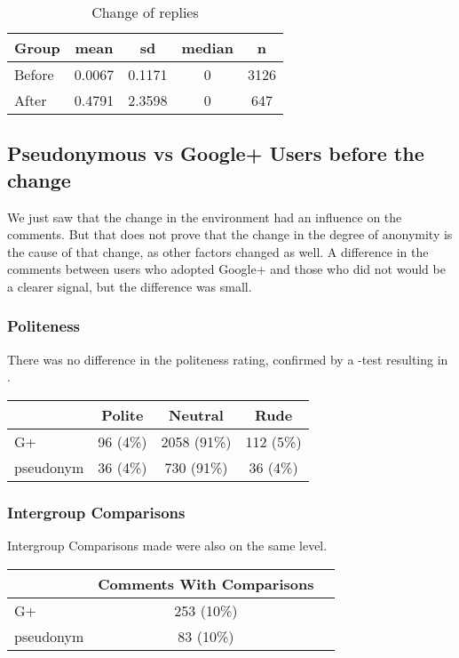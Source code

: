 \documentclass{chi-ext2}
\begin{document}
\begin{table}
\caption{Change of replies}
\centering
\begin{tabular}{| l | c | c | c | c |}
\hline
\hline
Group & mean & sd & median & n \\
\hline
Before & 0.0067 & 0.1171 & 0 & 3126 \\
After & 0.4791 & 2.3598 & 0 & 647 \\
\hline
\end{tabular}
\label{table:repliesChange}
\end{table}



\subsection{Pseudonymous vs Google+ Users before the change}

We just saw that the change in the environment had an influence on the comments. But that does not prove that the change in the degree of anonymity is the cause of that change, as other factors changed as well. A difference in the comments between users who adopted Google+ and those who did not would be a clearer signal, but the difference was small.

\subsubsection{Politeness}
There was no difference in the politeness rating, confirmed by a -test resulting in .

\begin{center}
\begin{tabular}{| l | c | c | c | }
    \hline
     & Polite & Neutral & Rude \\
    \hline
    G+ & 96 (4\%) & 2058 (91\%) & 112 (5\%) \\
    pseudonym & 36 (4\%) & 730 (91\%) & 36 (4\%) \\
 \hline
\end{tabular}
\end{center}

\subsubsection{Intergroup Comparisons}
Intergroup Comparisons made were also on the same level.

\begin{center}
\begin{tabular}{| l | c | c | }
    \hline
     & Comments With Comparisons \\
    \hline
    G+ & 253 (10\%) \\
    pseudonym & 83 (10\%) \\
 \hline
\end{tabular}
\end{center}
\end{document}
